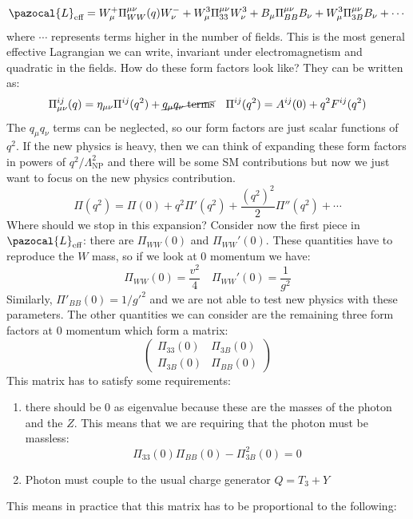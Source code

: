 \documentclass[../main.tex]{subfiles}
\begin{document}
\[
\pazocal{L}_{\text{eff}}=W_\mu^+\Pi_{WW}^{\mu\nu}(q)W_\nu^-+W_\mu^3\Pi_{33}^{\mu\nu}W_\nu^3+B_\mu\Pi_{BB}^{\mu\nu}B_\nu+W_\mu^3\Pi_{3B}^{\mu\nu}B_\nu+\cdots
\]
where $\cdots$ represents terms higher in the number of fields. This is the most general effective Lagrangian we can write, invariant under electromagnetism and quadratic in the fields. How do these form factors look like? They can be written as:
\[
\Pi_{\mu\nu}^{ij}(q)=\eta_{\mu\nu}\Pi^{ij}(q^2)+\cancel{q_\mu q_\nu\;\text{terms}} \quad \Pi^{ij}(q^2)=A^{ij}(0)+q^2F^{ij}(q^2)
\]
The $q_\mu q_\nu$ terms can be neglected, so our form factors are just scalar functions of $q^2$. If the new physics is heavy, then we can think of expanding these form factors in powers of $q^2/\Lambda_{\text{NP}}^2$ and there will be some SM contributions but now we just want to focus on the new physics contribution. 
\[
\Pi(q^2)=\Pi(0)+q^2\Pi'(q^2)+\frac{(q^2)^2}{2}\Pi''(q^2)+\cdots
\]
Where should we stop in this expansion? Consider now the first piece in $\pazocal{L}_{\text{eff}}$: there are $\Pi_{WW}(0)$ and $\Pi_{WW}'(0)$. These quantities have to reproduce the $W$ mass, so if we look at 0 momentum we have:
\[
\Pi_{WW}(0)=\frac{v^2}{4} \quad \Pi_{WW}'(0)=\frac{1}{g^2}
\]
Similarly, $\Pi'_{BB}(0)=1/g'^2$ and we are not able to test new physics with these parameters. The other quantities we can consider are the remaining three form factors at 0 momentum which form a matrix:
\[
\left(\begin{array}{cc}
    \Pi_{33}(0) & \Pi_{3B}(0) \\
    \Pi_{3B}(0) & \Pi_{BB}(0) 
\end{array}\right)
\]
This matrix has to satisfy some requirements:
\begin{enumerate}[label=\roman*)]
    \item there should be 0 as eigenvalue because these are the masses of the photon and the $Z$. This means that we are requiring that the photon must be massless:
    \[
    \Pi_{33}(0)\Pi_{BB}(0)-\Pi_{3B}^2(0)=0
    \]
    \item Photon must couple to the usual charge generator $Q=T_3+Y$
\end{enumerate}
This means in practice that this matrix has to be proportional to the following:
\end{document}
